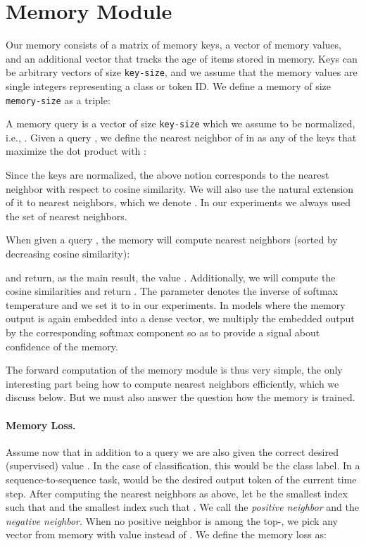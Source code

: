 \documentclass{article} \usepackage{iclr2017_conference,times}
\begin{document}
\section{Memory Module}

Our memory consists of a matrix  of memory keys, a vector  of memory values,
and an additional vector  that tracks the age of items stored in memory.
Keys can be arbitrary vectors of size \texttt{key-size}, and
we assume that the memory values are single integers representing 
a class or token ID.
We define a memory of size \texttt{memory-size} as a triple:


A memory query is a vector of size \texttt{key-size} which we assume
to be normalized, i.e., . Given a query , we define the nearest
neighbor of  in  as any of the keys that maximize the dot product with :

Since the keys are normalized, the above notion
corresponds to the nearest neighbor with respect to cosine similarity.
We will also use the natural extension of it to  nearest
neighbors, which we denote . In our
experiments we always used the set of  nearest neighbors.

When given a query , the memory  will compute
 nearest neighbors (sorted by decreasing cosine similarity):

and return, as the main result, the value .
Additionally, we will compute the cosine similarities 
and return .
The parameter  denotes the inverse of softmax temperature and we set it to  in our experiments. In models where the memory output
is again embedded into a dense vector, we multiply the embedded output
by the corresponding softmax component so as to provide a signal
about confidence of the memory.

The forward computation of the memory module is thus very simple,
the only interesting part being how to compute nearest neighbors efficiently,
which we discuss below. But we must also answer the question how the memory is trained.

\paragraph{Memory Loss.}
Assume now that in addition to a query  we are also given the correct desired (supervised) value .
In the case of classification, this  would be the class label.  
In a sequence-to-sequence task,  would be the desired output token of the
current time step.
After computing the  nearest neighbors  as above,
let  be the smallest index such that  and  the smallest
index such that . We call  the \emph{positive neighbor} and  the \emph{negative neighbor}.
When no positive neighbor is among the top-, we pick any vector from memory with value  instead of .  We define the memory loss as:
\end{document}
